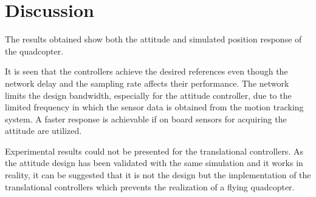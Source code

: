 \section{Discussion}\label{sec:discussion}

The results obtained show both the attitude and simulated position response of the quadcopter. 

It is seen that the controllers achieve the desired references even though the network delay and the sampling rate affects their performance. The network limits the design bandwidth, especially for the attitude controller, due to the limited frequency in which the sensor data is obtained from the motion tracking system. A faster response is achievable if on board sensors for acquiring the attitude are utilized.

Experimental results could not be presented for the translational controllers. As the attitude design has been validated with the same simulation and it works in reality, it can be suggested that it is not the design but the implementation of the translational controllers which prevents the realization of a flying quadcopter.
%
